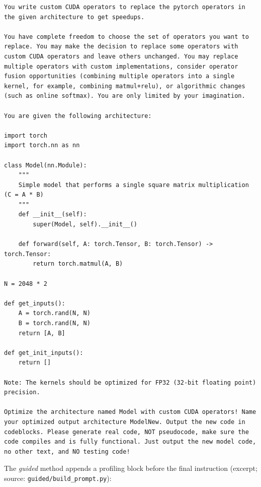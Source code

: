 \documentclass[conference]{IEEEtran}
\begin{document}
\begin{lstlisting}
You write custom CUDA operators to replace the pytorch operators in the given architecture to get speedups.

You have complete freedom to choose the set of operators you want to replace. You may make the decision to replace some operators with custom CUDA operators and leave others unchanged. You may replace multiple operators with custom implementations, consider operator fusion opportunities (combining multiple operators into a single kernel, for example, combining matmul+relu), or algorithmic changes (such as online softmax). You are only limited by your imagination.

You are given the following architecture:

import torch
import torch.nn as nn

class Model(nn.Module):
    """
    Simple model that performs a single square matrix multiplication (C = A * B)
    """
    def __init__(self):
        super(Model, self).__init__()

    def forward(self, A: torch.Tensor, B: torch.Tensor) -> torch.Tensor:
        return torch.matmul(A, B)

N = 2048 * 2

def get_inputs():
    A = torch.rand(N, N)
    B = torch.rand(N, N)
    return [A, B]

def get_init_inputs():
    return []

Note: The kernels should be optimized for FP32 (32-bit floating point) precision.

Optimize the architecture named Model with custom CUDA operators! Name your optimized output architecture ModelNew. Output the new code in codeblocks. Please generate real code, NOT pseudocode, make sure the code compiles and is fully functional. Just output the new model code, no other text, and NO testing code!
\end{lstlisting}

\noindent The \emph{guided} method appends a profiling block before the final
instruction (excerpt; source: \texttt{guided/build\_prompt.py}):
\end{document}
